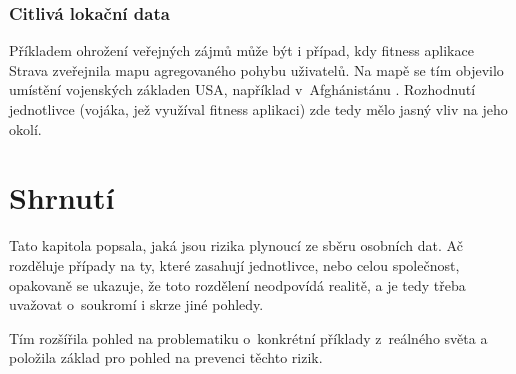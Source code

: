 \subsubsection*{Citlivá lokační data}
Příkladem ohrožení veřejných zájmů může být i případ, kdy fitness aplikace Strava zveřejnila mapu agregovaného pohybu uživatelů. Na mapě se tím objevilo umístění vojenských základen USA, například v~Afghánistánu \citep{strava-locations}. Rozhodnutí jednotlivce (vojáka, jež využíval fitness aplikaci) zde tedy mělo jasný vliv na jeho okolí.

\section*{Shrnutí}
Tato kapitola popsala, jaká jsou rizika plynoucí ze sběru osobních dat. Ač rozděluje případy na ty, které zasahují jednotlivce, nebo celou společnost, opakovaně se ukazuje, že toto rozdělení neodpovídá realitě, a je tedy třeba uvažovat o~soukromí i skrze jiné pohledy.

Tím rozšířila pohled na problematiku o~konkrétní příklady z~reálného světa a položila základ pro pohled na prevenci těchto rizik.